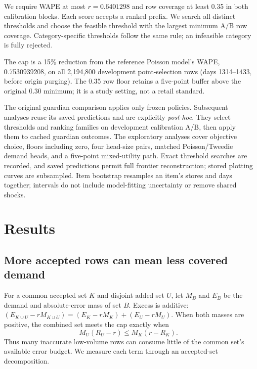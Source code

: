 \documentclass{article}
\begin{document}
We require WAPE at most $r=0.6401298$ and row coverage at least 0.35 in both calibration blocks. Each score accepts a ranked prefix. We search all distinct thresholds and choose the feasible threshold with the largest minimum A/B row coverage. Category-specific thresholds follow the same rule; an infeasible category is fully rejected.

The cap is a 15\% reduction from the reference Poisson model's WAPE, 0.7530939208, on all 2,194,800 development point-selection rows (days 1314--1433, before origin purging). The 0.35 row floor retains a five-point buffer above the original 0.30 minimum; it is a study setting, not a retail standard.

The original guardian comparison applies only frozen policies. Subsequent analyses reuse its saved predictions and are explicitly \emph{post-hoc}. They select thresholds and ranking families on development calibration A/B, then apply them to cached guardian outcomes. The exploratory analyses cover objective choice, floors including zero, four head-size pairs, matched Poisson/Tweedie demand heads, and a five-point mixed-utility path. Exact threshold searches are recorded, and saved predictions permit full frontier reconstruction; stored plotting curves are subsampled. Item bootstrap resamples an item's stores and days together; intervals do not include model-fitting uncertainty or remove shared shocks.

\section{Results}
\subsection{More accepted rows can mean less covered demand}
\label{sec:mass}
For a common accepted set $K$ and disjoint added set $U$, let $M_B$ and $E_B$ be the demand and absolute-error mass of set $B$. Excess is additive: $(E_{K\cup U}-rM_{K\cup U})=(E_K-rM_K)+(E_U-rM_U)$. When both masses are positive, the combined set meets the cap exactly when
\begin{equation}
 M_U(R_U-r)\leq M_K(r-R_K).
 \label{eq:budget}
\end{equation}
Thus many inaccurate low-volume rows can consume little of the common set's available error budget. We measure each term through an accepted-set decomposition.
\end{document}
